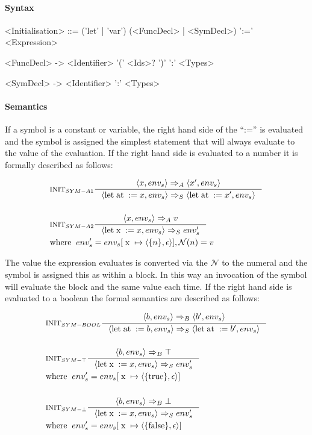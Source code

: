 \paragraph{Syntax}

\begin{grammar}
<Initialisation> ::= ('let' | 'var') (<FuncDecl> | <SymDecl>) ':=' <Expression>

<FuncDecl> -> <Identifier> '(' <Ids>? ')' ':' <Types>

<SymDecl> -> <Identifier> ':' <Types>
\end{grammar}

\paragraph{Semantics}

If a symbol is a constant or variable, the right hand side of the \enquote{:=} is evaluated and the symbol is assigned the simplest statement that will always evaluate to the value of the evaluation. If the right hand side is evaluated to a number it is formally described as follows:

\begin{align*}
&\inference[$\text{INIT}_{SYM-A1}$]{\Braket{x,env_s} \Rightarrow_A \Braket{x',env_s}}
                         {\Braket{\Tlet \Tat := x,env_s} \Rightarrow_S \Braket{\Tlet \Tat := x',env_s}}
\\\\
&\inference[$\text{INIT}_{SYM-A2}$]{\Braket{x,env_s} \Rightarrow_A v}
                         {\Braket{\Tlet \Tx := x,env_s} \Rightarrow_S env_s'}
\\
&{\Twhere env_s' = env_{s}[\Tx \mapsto \Braket{\{n\},\epsilon}], \mathcal{N}(n) = v}
\end{align*}

The value the expression evaluates is converted via the $\mathcal{N}$ to the numeral and the symbol is assigned this as within a block. In this way an invocation of the symbol will evaluate the block and the same value each time. If the right hand side is evaluated to a boolean the formal semantics are described as follows:

\begin{align*}
&\inference[$\text{INIT}_{SYM-BOOL}$]{\Braket{b,env_s} \Rightarrow_B \Braket{b',env_s}}
                         {\Braket{\Tlet \Tat := b,env_s} \Rightarrow_S \Braket{\Tlet \Tat := b',env_s}}
\\\\
&\inference[$\text{INIT}_{SYM-\top}$]{\Braket{b,env_s} \Rightarrow_B \top}
                         {\Braket{\Tlet \Tx := x,env_s} \Rightarrow_S env_s'}
\\
&{\Twhere env_s' = env_{s}[\Tx \mapsto \Braket{\{\Ttrue\},\epsilon}]}
\\\\
&\inference[$\text{INIT}_{SYM-\bot}$]{\Braket{b,env_s} \Rightarrow_B \bot}
                         {\Braket{\Tlet \Tx := x,env_s} \Rightarrow_S env_s'}
\\
&{\Twhere env_s' = env_{s}[\Tx \mapsto \Braket{\{\Tfalse\},\epsilon}]}
\end{align*}

